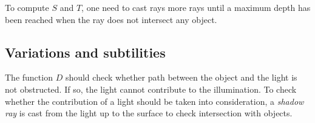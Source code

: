 To compute \(S\) and \(T\), one need to cast rays more rays until a maximum depth has been reached when the ray does not intersect any object.

\subsection{Variations and subtilities}
The function \(D\) should check whether path between the object and the light is not obstructed. If so, the light cannot contribute to the illumination.
To check whether the contribution of a light should be taken into consideration, a \textit{shadow ray} is cast from the light up to the surface to check intersection with objects.
